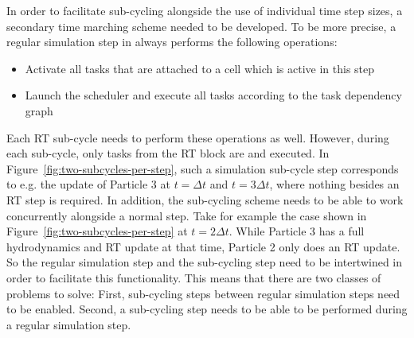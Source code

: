 In order to facilitate sub-cycling alongside the use of individual time step sizes, a secondary
time marching scheme needed to be developed. To be more precise, a regular simulation step in
\swift always performs the following operations:

\begin{itemize}
 \item Activate all tasks that are attached to a cell which is active in this step
 \item Launch the scheduler and execute all tasks according to the task dependency graph
\end{itemize}

Each RT sub-cycle needs to perform these operations as well. However, during each sub-cycle, only
tasks from the RT block are  and executed. In
Figure~\ref{fig:two-subcycles-per-step}, such a simulation sub-cycle step corresponds to e.g. the
update of Particle 3 at $t = \Delta t$ and $t = 3 \Delta t$, where nothing besides an RT step is
required. In addition, the sub-cycling scheme needs to be able to work concurrently alongside a
normal step. Take for example the case shown in Figure~\ref{fig:two-subcycles-per-step} at $t = 2
\Delta t$. While Particle 3 has a full hydrodynamics and RT update at that time, Particle 2 only
does an RT update. So the regular simulation step and the sub-cycling step need to be intertwined in
order to facilitate this functionality. This means that there are two classes of problems to solve:
First, sub-cycling steps between regular simulation steps need to be enabled. Second, a sub-cycling
step needs to be able to be performed during a regular simulation step.

